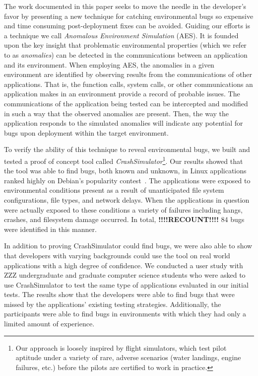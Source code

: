 The work documented in this paper
seeks to move the needle in the developer's favor
by presenting a new technique for catching environmental bugs
so expensive and time consuming post-deployment fixes can be avoided.
Guiding our efforts
is a technique
we call \textit{Anomalous Environment Simulation} (AES).
It is founded upon the key insight
that problematic environmental properties
(which we refer to as \textit{anomalies})
can be detected in the communications
between an application and its environment.
When employing AES,
the anomalies in a given environment
are identified by
observing results from the communications of other applications.
That is,
the function calls,
system calls,
or other communications an application makes in an environment provide
a record of probable issues.
The communications of the application being tested can be intercepted
and modified in such a way
that the observed anomalies are present.
Then, the way the application responds to the simulated anomalies
will indicate any potential for bugs upon deployment
within the target environment.

To verify the ability of this technique to reveal environmental
bugs, we built and tested a proof of concept tool
called {\em CrashSimulator}\footnote{Our approach is
loosely inspired by flight simulators, which test pilot aptitude under a
variety of rare, adverse scenarios (water landings, engine failures, etc.)
before the pilots are certified to work in practice.}.
Our results showed that the tool was able to find bugs,
both known and unknown,
in Linux applications ranked highly on Debian's popularity
contest~\cite{DebPopCon}.  The applications were exposed to
environmental conditions present as a result of unanticipated
file system configurations, file types, and network delays.
When the applications in
question were actually exposed to these conditions a variety of failures
including hangs, crashes, and filesystem damage occurred.  In total,
\textbf{!!!!RECOUNT!!!!} 84
bugs were identified in this manner.

In addition to proving CrashSimulator could find bugs, we were also able to
show that developers with varying backgrounds
could use the tool
on real world applications
with a high degree of confidence.
We conducted a user study with
ZZZ undergraduate and graduate computer science students
who were asked to use CrashSimulator to test
the same type of applications evaluated in our initial tests.
The results show that the developers were able to find bugs
that were missed by the applications' existing testing strategies.
Additionally, the
participants were able to find bugs
in environments with which they had only a limited amount of experience.

